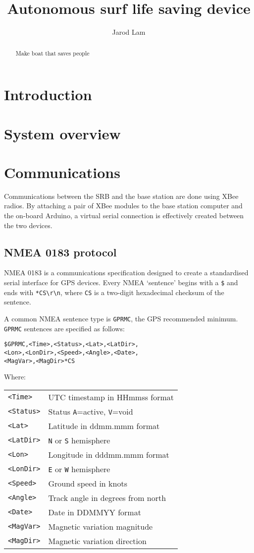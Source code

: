\documentclass[a4paper]{IEEEtran}
\title{Autonomous surf life saving device}
\author{Jarod Lam}
\newenvironment{nmeaspec}[1]
{
\newcommand{\field}[2]{\texttt{##1} & ##2 \\}
\vspace{0.2cm}
\noindent\texttt{#1}
\vspace{0.2cm}

\noindent Where: \vspace{0.1cm}\\  \noindent
\vspace{0.2cm}
\begin{tabular}{ll}
}
{
\end{tabular}
}
\begin{document}
\maketitle

\begin{abstract}
Make boat that saves people
\end{abstract}

\section{Introduction}


\section{System overview}


\section{Communications}
Communications between the SRB and the base station are done using XBee radios. By attaching a pair of XBee modules to the base station computer and the on-board Arduino, a virtual serial connection is effectively created between the two devices.

\subsection{NMEA 0183 protocol}
NMEA 0183 is a communications specification designed to create a standardised serial interface for GPS devices. Every NMEA `sentence' begins with a \texttt{\$} and ends with \texttt{*CS\textbackslash r\textbackslash n}, where \texttt{CS} is a two-digit hexadecimal checksum of the sentence.

A common NMEA sentence type is \texttt{GPRMC}, the GPS recommended minimum. \texttt{GPRMC} sentences are specified as follows: \cite{gpsinfo}

\begin{nmeaspec}{\$GPRMC,<Time>,<Status>,<Lat>,<LatDir>,\\<Lon>,<LonDir>,<Speed>,<Angle>,<Date>,\\<MagVar>,<MagDir>*CS}
\field{<Time>}{UTC timestamp in HHmmss format}
\field{<Status>}{Status \texttt{A}=active, \texttt{V}=void}
\field{<Lat>}{Latitude in ddmm.mmm format}
\field{<LatDir>}{\texttt{N} or \texttt{S} hemisphere}
\field{<Lon>}{Longitude in dddmm.mmm format}
\field{<LonDir>}{\texttt{E} or \texttt{W} hemisphere}
\field{<Speed>}{Ground speed in knots}
\field{<Angle>}{Track angle in degrees from north}
\field{<Date>}{Date in DDMMYY format}
\field{<MagVar>}{Magnetic variation magnitude}
\field{<MagDir>}{Magnetic variation direction}
\end{nmeaspec}
\end{document}
